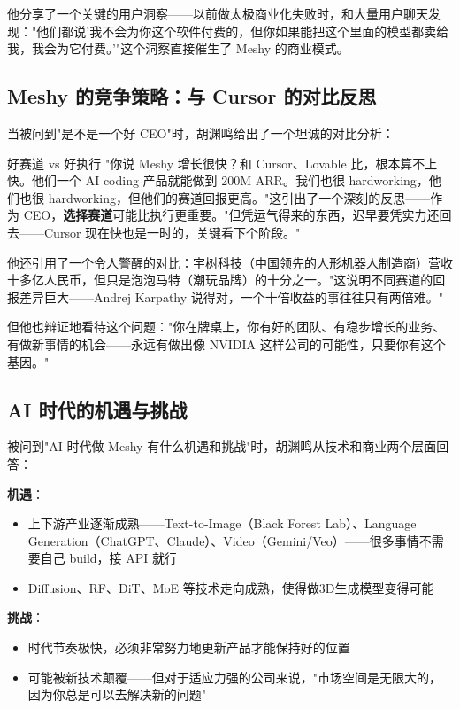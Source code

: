 他分享了一个关键的用户洞察——以前做太极商业化失败时，和大量用户聊天发现："他们都说'我不会为你这个软件付费的，但你如果能把这个里面的模型都卖给我，我会为它付费。'"这个洞察直接催生了 Meshy 的商业模式。

\subsection{Meshy 的竞争策略：与 Cursor 的对比反思}

当被问到"是不是一个好 CEO"时，胡渊鸣给出了一个坦诚的对比分析：

\begin{knowledgebox}{好赛道 vs 好执行}
"你说 Meshy 增长很快？和 Cursor、Lovable 比，根本算不上快。他们一个 AI coding 产品就能做到 200M ARR。我们也很 hardworking，他们也很 hardworking，但他们的赛道回报更高。"这引出了一个深刻的反思——作为 CEO，\textbf{选择赛道}可能比执行更重要。"但凭运气得来的东西，迟早要凭实力还回去——Cursor 现在快也是一时的，关键看下个阶段。"
\end{knowledgebox}

他还引用了一个令人警醒的对比：宇树科技（中国领先的人形机器人制造商）营收十多亿人民币，但只是泡泡马特（潮玩品牌）的十分之一。"这说明不同赛道的回报差异巨大——Andrej Karpathy 说得对，一个十倍收益的事往往只有两倍难。"

但他也辩证地看待这个问题："你在牌桌上，你有好的团队、有稳步增长的业务、有做新事情的机会——永远有做出像 NVIDIA 这样公司的可能性，只要你有这个基因。"

\subsection{AI 时代的机遇与挑战}

被问到"AI 时代做 Meshy 有什么机遇和挑战"时，胡渊鸣从技术和商业两个层面回答：

\textbf{机遇}：
\begin{itemize}
\item 上下游产业逐渐成熟——Text-to-Image（Black Forest Lab）、Language Generation（ChatGPT、Claude）、Video（Gemini/Veo）——很多事情不需要自己 build，接 API 就行
\item Diffusion、RF、DiT、MoE 等技术走向成熟，使得做3D生成模型变得可能
\end{itemize}

\textbf{挑战}：
\begin{itemize}
\item 时代节奏极快，必须非常努力地更新产品才能保持好的位置
\item 可能被新技术颠覆——但对于适应力强的公司来说，"市场空间是无限大的，因为你总是可以去解决新的问题"
\end{itemize}

